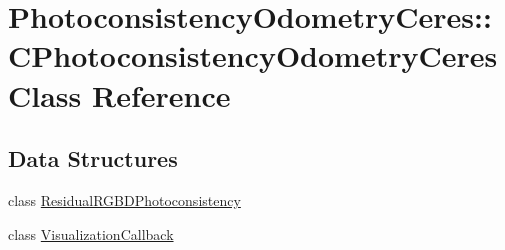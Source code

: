 \hypertarget{class_photoconsistency_odometry_ceres_1_1_c_photoconsistency_odometry_ceres}{
\section{PhotoconsistencyOdometryCeres::CPhotoconsistencyOdometryCeres Class Reference}
\label{class_photoconsistency_odometry_ceres_1_1_c_photoconsistency_odometry_ceres}
}
\subsection*{Data Structures}
\begin{DoxyCompactItemize}
\item 
class \hyperlink{class_photoconsistency_odometry_ceres_1_1_c_photoconsistency_odometry_ceres_1_1_residual_r_g_b_d_photoconsistency}{ResidualRGBDPhotoconsistency}
\item 
class \hyperlink{class_photoconsistency_odometry_ceres_1_1_c_photoconsistency_odometry_ceres_1_1_visualization_callback}{VisualizationCallback}
\end{DoxyCompactItemize}
